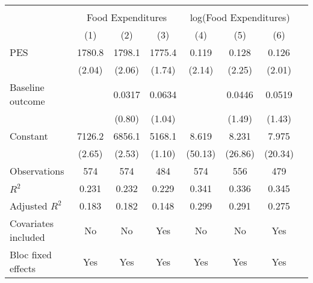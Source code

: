 \begin{tabular}{l*{7}{c}} \hline\hline  \\ & \multicolumn{3}{c}{Food Expenditures} & \multicolumn{3}{c}{log(Food Expenditures)} \\  \cmidrule(lr){2-4} \cmidrule(lr){5-7} 
                    &\multicolumn{1}{c}{(1)}         &\multicolumn{1}{c}{(2)}         &\multicolumn{1}{c}{(3)}         &\multicolumn{1}{c}{(4)}         &\multicolumn{1}{c}{(5)}         &\multicolumn{1}{c}{(6)}         \\
\hline
PES                 &      1780.8\sym{**} &      1798.1\sym{**} &      1775.4\sym{*}  &       0.119\sym{**} &       0.128\sym{**} &       0.126\sym{**} \\
                    &      (2.04)         &      (2.06)         &      (1.74)         &      (2.14)         &      (2.25)         &      (2.01)         \\
[1em]
Baseline outcome    &                     &      0.0317         &      0.0634         &                     &      0.0446         &      0.0519         \\
                    &                     &      (0.80)         &      (1.04)         &                     &      (1.49)         &      (1.43)         \\
[1em]
Constant            &      7126.2\sym{***}&      6856.1\sym{**} &      5168.1         &       8.619\sym{***}&       8.231\sym{***}&       7.975\sym{***}\\
                    &      (2.65)         &      (2.53)         &      (1.10)         &     (50.13)         &     (26.86)         &     (20.34)         \\
\hline
Observations        &         574         &         574         &         484         &         574         &         556         &         479         \\
\(R^{2}\)           &       0.231         &       0.232         &       0.229         &       0.341         &       0.336         &       0.345         \\
Adjusted \(R^{2}\)  &       0.183         &       0.182         &       0.148         &       0.299         &       0.291         &       0.275         \\
Covariates included &          No         &          No         &         Yes         &          No         &          No         &         Yes         \\
Bloc fixed effects  &         Yes         &         Yes         &         Yes         &         Yes         &         Yes         &         Yes         \\

\end{tabular}
